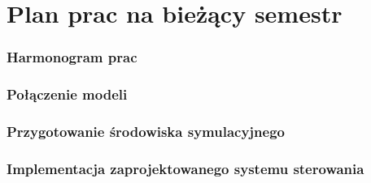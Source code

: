 \section{Plan prac na bieżący semestr}

\begin{frame}
	\frametitle{Harmonogram prac}
\end{frame}


\begin{frame}
	\frametitle{Połączenie modeli}
\end{frame}



\begin{frame}
	\frametitle{Przygotowanie środowiska symulacyjnego}
\end{frame}


\begin{frame}
	\frametitle{Implementacja zaprojektowanego systemu sterowania}
\end{frame}

